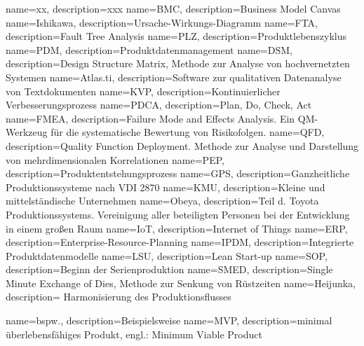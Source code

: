 %
{
  name=xx, 
  description={xxx}
}
%
%
{
  name=BMC, 
  description={Business Model Canvas}
}
%
%
{
  name=Ishikawa, 
  description={Ursache-Wirkungs-Diagramm}
}
%
%
{
  name=FTA, 
  description={Fault Tree Analysis}
}
%
%
{
  name=PLZ, 
  description={Produktlebenszyklus}
}
%
%
{
  name=PDM, 
  description={Produktdatenmanagement}
}
%
%
{
  name=DSM, 
  description={Design Structure Matrix, Methode zur Analyse von hochvernetzten Systemen}
}
%
%
{
  name=Atlas.ti, 
  description={Software zur qualitativen Datenanalyse von Textdokumenten}
}
%
%
{
  name=KVP, 
  description={Kontinuierlicher Verbesserungsprozess}
}
%
%
{
  name=PDCA, 
  description={Plan, Do, Check, Act}
}
%
%
{
  name=FMEA, 
  description={Failure Mode and Effects Analysis. Ein QM-Werkzeug für die systematische Bewertung von Risikofolgen.}
}
%
%
{
  name=QFD, 
  description={Quality Function Deployment. Methode zur Analyse und Darstellung von mehrdimensionalen Korrelationen}
}
%
%
{
  name=PEP, 
  description={Produktentstehungsprozess}
}
%
%
{
  name=GPS, 
  description={Ganzheitliche Produktionssysteme nach VDI 2870}
}
%
%
{
  name=KMU, 
  description={Kleine und mittelständische Unternehmen}
}
%
%
{
  name=Obeya, 
  description={Teil d. Toyota Produktionssystems. Vereinigung aller beteiligten Personen bei der Entwicklung in einem großen Raum}
}
%
{
  name=IoT, 
  description={Internet of Things}
}
%
%
{
  name=ERP, 
  description={Enterprise-Resource-Planning}
}
%
{
  name=IPDM, 
  description={Integrierte Produktdatenmodelle}
}
%
{
  name=LSU, 
  description={Lean Start-up}
}
%
{
  name=SOP, 
  description={Beginn der Serienproduktion}
}
%
{
  name=SMED, 
  description={Single Minute Exchange of Dies, Methode zur Senkung von Rüstzeiten}
}
%
{
  name=Heijunka, 
  description={
Harmonisierung des Produktionsflusses}
}

{
  name=bspw.,
  description={Beispielsweise}
}
%
{  
  name=MVP,
  description={minimal überlebensfähiges Produkt, engl.: Minimum Viable
Product}
}
